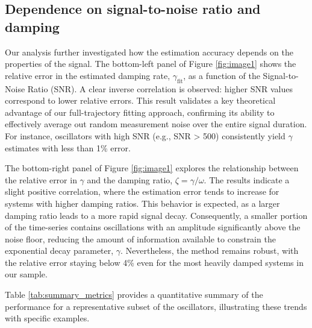 \documentclass[]{article}
\begin{document}
\subsection{Dependence on signal-to-noise ratio and damping}

Our analysis further investigated how the estimation accuracy depends on the properties of the signal. The bottom-left panel of Figure \ref{fig:image1} shows the relative error in the estimated damping rate, $\gamma_{\text{fit}}$, as a function of the Signal-to-Noise Ratio (SNR). A clear inverse correlation is observed: higher SNR values correspond to lower relative errors. This result validates a key theoretical advantage of our full-trajectory fitting approach, confirming its ability to effectively average out random measurement noise over the entire signal duration. For instance, oscillators with high SNR (e.g., SNR > 500) consistently yield $\gamma$ estimates with less than 1\% error.

The bottom-right panel of Figure \ref{fig:image1} explores the relationship between the relative error in $\gamma$ and the damping ratio, $\zeta = \gamma / \omega$. The results indicate a slight positive correlation, where the estimation error tends to increase for systems with higher damping ratios. This behavior is expected, as a larger damping ratio leads to a more rapid signal decay. Consequently, a smaller portion of the time-series contains oscillations with an amplitude significantly above the noise floor, reducing the amount of information available to constrain the exponential decay parameter, $\gamma$. Nevertheless, the method remains robust, with the relative error staying below 4\% even for the most heavily damped systems in our sample.

Table \ref{tab:summary_metrics} provides a quantitative summary of the performance for a representative subset of the oscillators, illustrating these trends with specific examples.

\begin{table}[t]
    \centering
    \caption{Performance metrics for a representative subset of the oscillators. The table highlights the consistency of the MLE framework, showing the calculated Signal-to-Noise Ratio (SNR) and the relative errors for the recovered damping rate ($\gamma$) and angular frequency ($\omega$).}
    \label{tab:summary_metrics}
\end{table}
\end{document}
